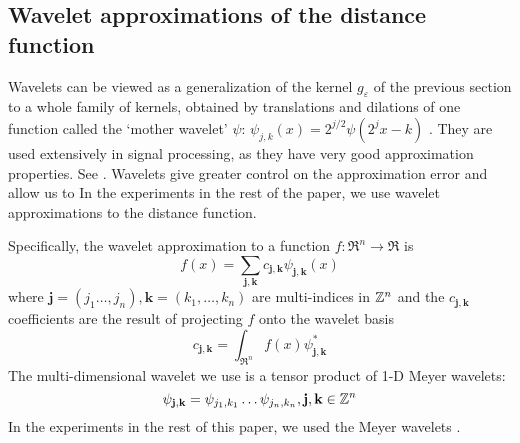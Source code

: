 \subsection{Wavelet approximations of the distance function}
\label{sec:waveletApx}

Wavelets can be viewed as a generalization of the kernel $g_\varepsilon$ of the previous section to a whole family of kernels, obtained by translations and dilations of one function called the `mother wavelet' $\psi$: $\psi_{j,k}(x) = 2^{j/2}\psi(2^jx - k)$  \cite{MallatBook}.
They are used extensively in signal processing, as they have very good approximation properties.
See \cite{MallatBook}.
Wavelets give greater control on the approximation error and allow us to 
In the experiments in the rest of the paper, we use wavelet approximations to the distance function.

Specifically, the wavelet approximation to a function $f:\Re^n \rightarrow \Re$ is 
\[f(x) = \sum_{\mathbf{j,k}}c_{\mathbf{j,k}}\psi_{\mathbf{j,k}}(x)\]
where $\mathbf{j} = (j_1\ldots,j_n), \mathbf{k} = (k_1,\ldots,k_n)$ are multi-indices in $\mathbb{Z}^n$ 
and the $c_{\mathbf{j,k}}$ coefficients are the result of projecting $f$ onto the wavelet basis
\[c_{\mathbf{j,k}} = \int_{\Re^n}f(x)\psi_{\mathbf{j,k}}^*\]
The multi-dimensional wavelet we use is a tensor product of 1-D Meyer wavelets:
\begin{equation}
\label{eq:multid meyer}
\psi_{\mathbf{j,k}} = \psi_{j_1,k_1}\ldots \psi_{j_n,k_n}, \mathbf{j,k} \in \mathbb{Z}^n
\end{equation}
In the experiments in the rest of this paper, we used the Meyer wavelets \cite{MallatBook}. 

 
